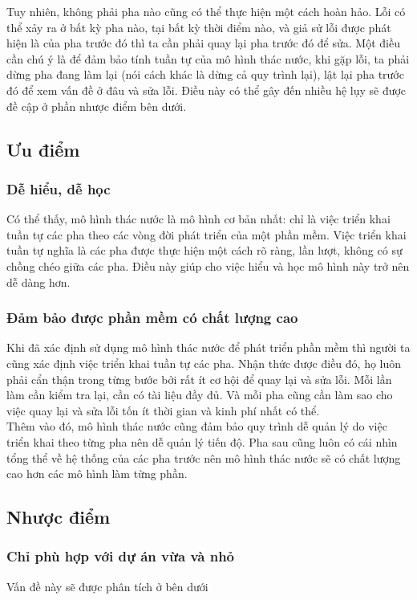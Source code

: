 \documentclass[14pt]{extarticle}
\begin{document}
Tuy nhiên, không phải pha nào cũng có thể thực hiện một cách hoàn hảo.
Lỗi có thể xảy ra ở bất kỳ pha nào, tại bất kỳ thời điểm nào, và giả
sử lỗi được phát hiện là của pha trước đó thì ta cần phải quay lại pha
trước đó để sửa. Một điều cần chú ý là để đảm bảo tính tuần tự của
mô hình thác nước, khi gặp lỗi, ta phải dừng pha đang làm lại (nói
cách khác là dừng cả quy trình lại), lật lại pha trước đó để xem
vấn đề ở đâu và sửa lỗi. Điều này có thể gây đến nhiều hệ lụy sẽ được
đề cập ở phần nhược điểm bên dưới.

\subsection{Ưu điểm}

\subsubsection*{Dễ hiểu, dễ học}
Có thể thấy, mô hình thác nước là mô hình cơ bản nhất: chỉ là việc
triển khai tuần tự các pha theo các vòng đời phát triển của một phần mềm.
Việc triển khai tuần tự nghĩa là các pha được thực hiện một cách rõ ràng,
lần lượt, không có sự chồng chéo giữa các pha. Điều này giúp cho việc
hiểu và học mô hình này trở nên dễ dàng hơn.

\subsubsection*{Đảm bảo được phần mềm có chất lượng cao}
Khi đã xác định sử dụng mô hình thác nước để phát triển phần mềm
thì người ta cũng xác định việc triển khai tuần tự các pha. Nhận thức
được điều đó, họ luôn phải cẩn thận trong từng bước bởi rất ít cơ hội
để quay lại và sửa lỗi. Mỗi lần làm cần kiểm tra lại, cần có tài liệu
đầy đủ. Và mỗi pha cũng cần làm sao cho việc quay lại và sửa lỗi
tốn ít thời gian và kinh phí nhất có thể.\\

Thêm vào đó, mô hình thác nước cũng đảm bảo quy trình dễ quản lý do
việc triển khai theo từng pha nên dễ quản lý tiến độ. Pha sau cũng luôn
có cái nhìn tổng thể về hệ thống của các pha trước nên mô hình thác nước
sẽ có chất lượng cao hơn các mô hình làm từng phần.


\subsection{Nhược điểm}

\subsubsection*{Chỉ phù hợp với dự án vừa và nhỏ}
Vấn đề này sẽ được phân tích ở bên dưới
\end{document}
